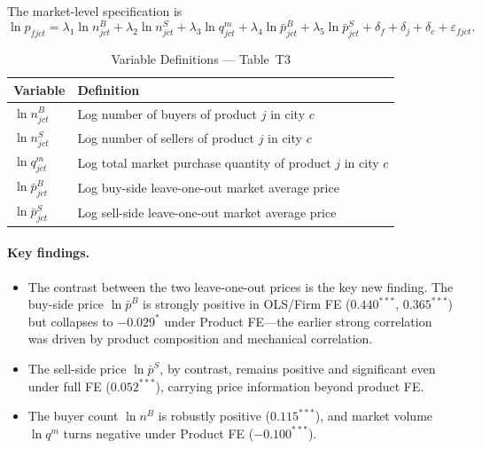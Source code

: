 \documentclass[12pt]{article}
\begin{document}
The market-level specification is
\begin{equation}
  \ln p_{fjct}
  = \lambda_1 \ln n^{B}_{jct}
  + \lambda_2 \ln n^{S}_{jct}
  + \lambda_3 \ln q^{m}_{jct}
  + \lambda_4 \ln \bar{p}^{B}_{jct}
  + \lambda_5 \ln \bar{p}^{S}_{jct}
  + \delta_f + \delta_j + \delta_c
  + \varepsilon_{fjct}.
  \label{eq:t3}
\end{equation}

\begin{table}[H]
  \centering
  \caption{Variable Definitions --- Table~T3}
  \label{tab:vardef_t3}
  \begin{tabular}{L{3.5cm} L{10.5cm}}
    \toprule
    Variable & Definition \\
    \midrule
    \(\ln n^{B}_{jct}\) &
      Log number of buyers of product \(j\) in city \(c\)  \\[4pt]
    \(\ln n^{S}_{jct}\) &
      Log number of sellers of product \(j\) in city \(c\) \\[4pt]
    \(\ln q^{m}_{jct}\) &
      Log total market purchase quantity of product \(j\) in city \(c\) \\[4pt]
    \(\ln \bar{p}^{B}_{jct}\) &
      Log buy-side leave-one-out market average price  \\[4pt]
    \(\ln \bar{p}^{S}_{jct}\) &
      Log sell-side leave-one-out market average price  \\
    \bottomrule
  \end{tabular}
\end{table}

\paragraph{Key findings.}
\begin{itemize}[leftmargin=1.5em,nosep]
  \item The contrast between the two leave-one-out prices is the key new
    finding. The buy-side price \(\ln\bar{p}^{B}\) is strongly positive in
    OLS/Firm FE (\(0.440^{***}\), \(0.365^{***}\)) but collapses to
    \(-0.029^{*}\) under Product FE---the earlier strong correlation was driven
    by product composition and mechanical correlation.
  \item The sell-side price \(\ln\bar{p}^{S}\), by contrast, remains positive and
    significant even under full FE (\(0.052^{***}\)), carrying price information
    beyond product FE.
  \item The buyer count \(\ln n^{B}\) is robustly positive (\(0.115^{***}\)), and
    market volume \(\ln q^{m}\) turns negative under Product FE
    (\(-0.100^{***}\)).
\end{itemize}
\end{document}

